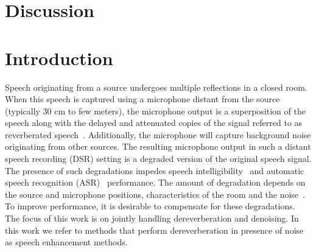 \section{Discussion}

\iffalse
\section{Introduction}
Speech originating from a source undergoes multiple reflections in a closed room. When this speech is captured using a microphone distant from the source (typically 30 cm to few meters), the microphone output is a superposition of the speech along with the delayed and attenuated copies of the signal referred to as reverberated speech~\cite{naylor2010speech}. Additionally, the microphone will capture background noise originating from other sources. The resulting microphone output in such a distant speech recording (DSR) setting is a degraded version of the original speech signal. The presence of such degradations impedes speech intelligibility~\cite{kinoshita2016summary}  and automatic speech recognition (ASR)~\cite{barker2018fifth, barker2015third} performance. The amount of degradation depends on the source and microphone positions, characteristics of the room and the noise~\cite{naylor2010speech,kinoshita2016summary}. To improve performance, it is desirable to compensate for these degradations. The focus of this work is on jointly handling dereverberation and denoising. In this work we refer to methods that perform dereverberation in presence of noise as speech enhancement methods.

